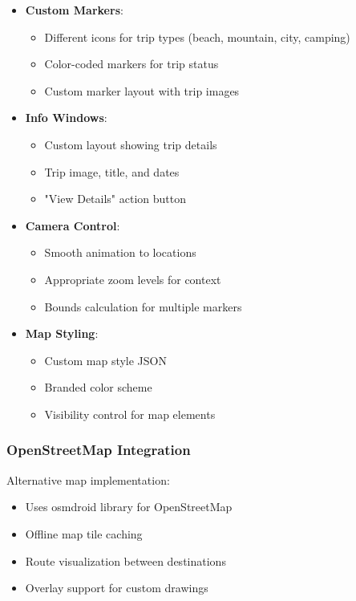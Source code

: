 \documentclass[12pt,a4paper]{article}
\begin{document}
\begin{itemize}
    \item \textbf{Custom Markers}:
    \begin{itemize}
        \item Different icons for trip types (beach, mountain, city, camping)
        \item Color-coded markers for trip status
        \item Custom marker layout with trip images
    \end{itemize}

    \item \textbf{Info Windows}:
    \begin{itemize}
        \item Custom layout showing trip details
        \item Trip image, title, and dates
        \item "View Details" action button
    \end{itemize}

    \item \textbf{Camera Control}:
    \begin{itemize}
        \item Smooth animation to locations
        \item Appropriate zoom levels for context
        \item Bounds calculation for multiple markers
    \end{itemize}

    \item \textbf{Map Styling}:
    \begin{itemize}
        \item Custom map style JSON
        \item Branded color scheme
        \item Visibility control for map elements
    \end{itemize}
\end{itemize}

\subsubsection{OpenStreetMap Integration}
Alternative map implementation:

\begin{itemize}
    \item Uses osmdroid library for OpenStreetMap
    \item Offline map tile caching
    \item Route visualization between destinations
    \item Overlay support for custom drawings
\end{itemize}
\end{document}
